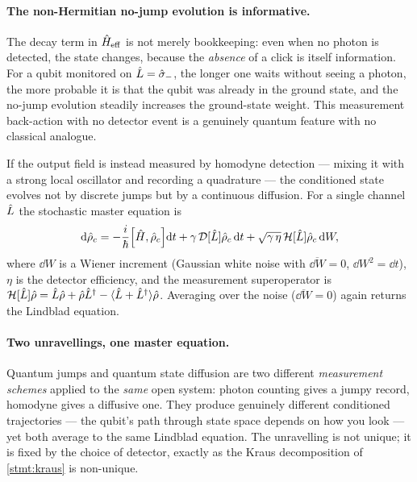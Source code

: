 \paragraph{The non-Hermitian no-jump evolution is informative.}
The decay term in $\hat{H}_{\rm eff}$ is not merely bookkeeping: even
when no photon is detected, the state changes, because the
\emph{absence} of a click is itself information. For a qubit
monitored on $\hat{L}=\hat\sigma_-$, the longer one waits without
seeing a photon, the more probable it is that the qubit was already
in the ground state, and the no-jump evolution steadily increases
the ground-state weight. This measurement back-action with no
detector event is a genuinely quantum feature with no classical
analogue.

\begin{statement}
\label{stmt:qsd}
If the output field is instead measured by homodyne detection ---
mixing it with a strong local oscillator and recording a
quadrature --- the conditioned state evolves not by discrete jumps
but by a continuous diffusion. For a single channel $\hat{L}$ the
stochastic master equation is
\begin{equation}
\label{eq:sme}
\dd\op\rho_c
= -\frac{i}{\hbar}\comm{\op H}{\op\rho_c}\dd t
+ \gamma\,\mathcal D[\op L]\op\rho_c\,\dd t
+ \sqrt{\gamma\,\eta}\,\mathcal H[\op L]\op\rho_c\,\dd W,
\end{equation}
where $\dd W$ is a Wiener increment (Gaussian white noise with
$\overline{\dd W}=0$, $\dd W^2=\dd t$), $\eta$ is the detector
efficiency, and the measurement superoperator is
$\mathcal H[\hat{L}]\hat{\rho} = \hat{L}\hat{\rho}+\hat{\rho}\hat{L}^\dagger
-\langle\hat{L}+\hat{L}^\dagger\rangle\hat{\rho}$. Averaging over the noise
($\overline{\dd W}=0$) again returns the Lindblad equation.
\end{statement}

\paragraph{Two unravellings, one master equation.}
Quantum jumps and quantum state diffusion are two different
\emph{measurement schemes} applied to the \emph{same} open system:
photon counting gives a jumpy record, homodyne gives a diffusive
one. They produce genuinely different conditioned trajectories ---
the qubit's path through state space depends on how you look --- yet
both average to the same Lindblad equation. The unravelling is not
unique; it is fixed by the choice of detector, exactly as the Kraus
decomposition of \cref{stmt:kraus} is non-unique.

